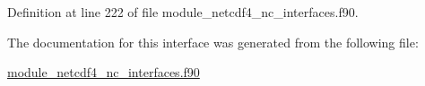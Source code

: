 Definition at line 222 of file module\+\_\+netcdf4\+\_\+nc\+\_\+interfaces.\+f90.



The documentation for this interface was generated from the following file\+:\begin{DoxyCompactItemize}
\item 
\hyperlink{module__netcdf4__nc__interfaces_8f90}{module\+\_\+netcdf4\+\_\+nc\+\_\+interfaces.\+f90}\end{DoxyCompactItemize}
